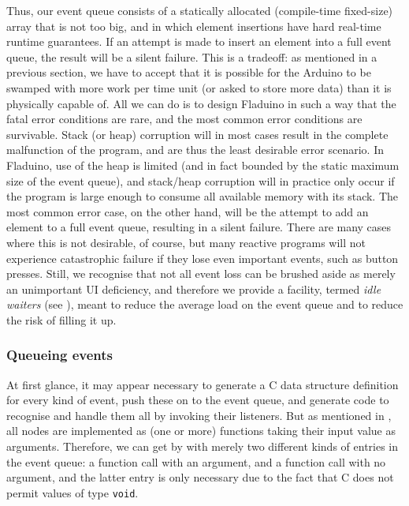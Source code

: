\documentclass[a4paper, oneside, final]{memoir}
\let\Fref\undefined
\begin{document}
Thus, our event queue consists of a statically allocated (compile-time
fixed-size) array that is not too big, and in which element insertions
have hard real-time runtime guarantees.  If an attempt is made to
insert an element into a full event queue, the result will be a silent
failure.  This is a tradeoff: as mentioned in a previous section, we
have to accept that it is possible for the Arduino to be swamped with
more work per time unit (or asked to store more data) than it is
physically capable of.  All we can do is to design Fladuino in such a
way that the fatal error conditions are rare, and the most common
error conditions are survivable.  Stack (or heap) corruption will in
most cases result in the complete malfunction of the program, and are
thus the least desirable error scenario.  In Fladuino, use of the heap
is limited (and in fact bounded by the static maximum size of the
event queue), and stack/heap corruption will in practice only occur if
the program is large enough to consume all available memory with its
stack.  The most common error case, on the other hand, will be the
attempt to add an element to a full event queue, resulting in a silent
failure.  There are many cases where this is not desirable, of course,
but many reactive programs will not experience catastrophic failure if
they lose even important events, such as button presses.  Still, we
recognise that not all event loss can be brushed aside as merely an
unimportant UI deficiency, and therefore we provide a facility, termed
\textit{idle waiters} (see \Fref{sec:idle waiters}), meant to reduce
the average load on the event queue and to reduce the risk of filling
it up.

\subsubsection{Queueing events}

At first glance, it may appear necessary to generate a C data
structure definition for every kind of event, push these on to the
event queue, and generate code to recognise and handle them all by
invoking their listeners.  But as mentioned in
\Fref{sec:dataflowtranslation}, all nodes are implemented as (one or
more) functions taking their input value as arguments.  Therefore, we
can get by with merely two different kinds of entries in the event
queue: a function call with an argument, and a function call with no
argument, and the latter entry is only necessary due to the fact that
C does not permit values of type \texttt{void}.
\end{document}
